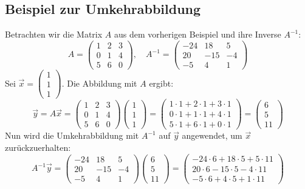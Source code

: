 \subsection{Beispiel zur Umkehrabbildung}
Betrachten wir die Matrix \(A\) aus dem vorherigen Beispiel und ihre Inverse
\(A^{-1}\):
\[ A = \begin{pmatrix}
        1 & 2 & 3 \\
        0 & 1 & 4 \\
        5 & 6 & 0
    \end{pmatrix}, \quad
    A^{-1} = \begin{pmatrix}
        -24 & 18  & 5  \\
        20  & -15 & -4 \\
        -5  & 4   & 1
    \end{pmatrix} \]
Sei \(\vec{x} = \begin{pmatrix} 1 \\ 1 \\ 1 \end{pmatrix}\). Die Abbildung mit \(A\) ergibt:
\[ \vec{y} = A\vec{x} = \begin{pmatrix}
        1 & 2 & 3 \\
        0 & 1 & 4 \\
        5 & 6 & 0
    \end{pmatrix}
    \begin{pmatrix} 1 \\ 1 \\ 1 \end{pmatrix} =
    \begin{pmatrix}
        1 \cdot 1 + 2 \cdot 1 + 3 \cdot 1 \\
        0 \cdot 1 + 1 \cdot 1 + 4 \cdot 1 \\
        5 \cdot 1 + 6 \cdot 1 + 0 \cdot 1
    \end{pmatrix} =
    \begin{pmatrix} 6 \\ 5 \\ 11 \end{pmatrix} \]
Nun wird die Umkehrabbildung mit \(A^{-1}\) auf \(\vec{y}\) angewendet, um
\(\vec{x}\) zurückzuerhalten:
\[ A^{-1}\vec{y} = \begin{pmatrix}
        -24 & 18  & 5  \\
        20  & -15 & -4 \\
        -5  & 4   & 1
    \end{pmatrix}
    \begin{pmatrix} 6 \\ 5 \\ 11 \end{pmatrix} =
    \begin{pmatrix}
        -24 \cdot 6 + 18 \cdot 5 + 5 \cdot 11 \\
        20 \cdot 6 - 15 \cdot 5 - 4 \cdot 11  \\
        -5 \cdot 6 + 4 \cdot 5 + 1 \cdot 11
    \end{pmatrix} \]
